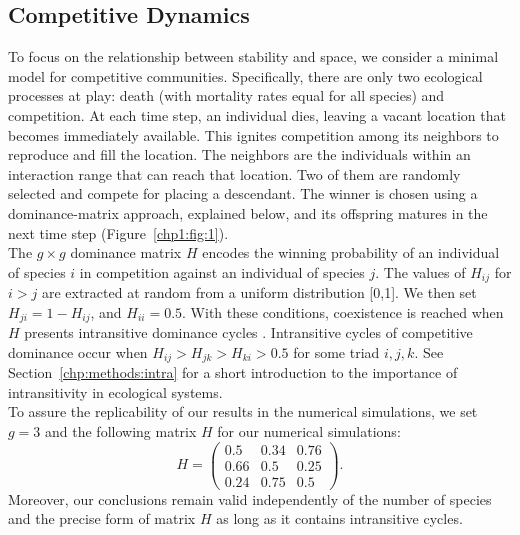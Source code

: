 \subsection{\label{chp1:1.1}Competitive Dynamics}
 To focus on the relationship between stability and space, we consider a minimal model for competitive communities. Specifically, there are only two ecological processes at play: death (with mortality rates equal for all species) and competition. At each time step, an individual dies, leaving a vacant location that becomes immediately available. This ignites competition among its neighbors to reproduce and fill the location. The neighbors are the individuals within an interaction range that can reach that location. Two of them are randomly selected and compete for placing a descendant. The winner is chosen using a dominance-matrix approach, explained below, and its offspring matures in the next time step (Figure~\ref{chp1:fig:1}). \\

 The $g \times g$ dominance matrix $H$ encodes the winning probability of an individual of species $i$  in competition against an individual of species $j$. The values of $H_{ij}$ for $i> j$ are extracted at random from a uniform distribution [0,1]. We then set  $H_{ji}=1-H_{ij}$, and $H_{ii}  = 0.5$. With these conditions, coexistence is reached when $H$ presents intransitive dominance cycles \cite{Grilli2017Higher-orderModels,Allesina2015PredictingWebs}. Intransitive cycles of competitive dominance occur when $H_{ij} > H_{jk}> H_{ki} > 0.5 $ for some triad $i,j,k$. See Section~\ref{chp:methods:intra} for a short introduction to the importance of intransitivity in ecological systems. \\

To assure the replicability of our results in the numerical simulations, we set $g = 3$ and the following matrix $H$ for our numerical simulations:
 \begin{equation}
 H = 
 \begin{pmatrix}
0.5 & 0.34 & 0.76 \\
0.66 & 0.5 & 0.25 \\
0.24 & 0.75 & 0.5 
\end{pmatrix}. \label{eq:H}
 \end{equation}
Moreover, our conclusions remain valid independently of the number of species and the precise form of matrix $H$ as long as it contains intransitive cycles.

%



